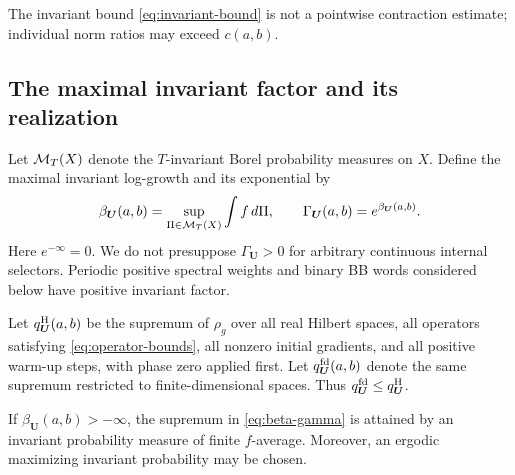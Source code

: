 \documentclass[letterpaper,twoside]{article}
\begin{document}
\begin{remark}
The invariant bound \eqref{eq:invariant-bound} is not a pointwise contraction
estimate; individual norm ratios may exceed $c(a,b)$.
\end{remark}

\subsection{The maximal invariant factor and its realization}

Let $\mathcal M_T(X)$ denote the $T$-invariant Borel probability measures on $X$.
Define the maximal invariant log-growth and its exponential by
\begin{equation}\label{eq:beta-gamma}
 \beta_{\bm U}(a,b)
 =\sup_{\Pi\in\mathcal M_T(X)}\int f\,d\Pi,
 \qquad
 \Gamma_{\bm U}(a,b)=e^{\beta_{\bm U}(a,b)}.
\end{equation}
Here $e^{-\infty}=0$. We do not presuppose $\Gamma_{\bm U}>0$ for arbitrary continuous internal selectors. Periodic positive spectral weights and binary BB words considered below have positive invariant factor.

Let $q^{\rm H}_{\bm U}(a,b)$ be the supremum of $\rho_g$ over all real
Hilbert spaces, all operators satisfying \eqref{eq:operator-bounds}, all
nonzero initial gradients, and all positive warm-up steps, with phase zero
applied first.  Let $q^{\rm fd}_{\bm U}(a,b)$ denote the same supremum
restricted to finite-dimensional spaces.  Thus
$q^{\rm fd}_{\bm U}\le q^{\rm H}_{\bm U}$.

\begin{lemma}\label{lem:max-attained}
If $\beta_{\bm U}(a,b)>-\infty$, the supremum in
\eqref{eq:beta-gamma} is attained by an invariant probability measure of
finite $f$-average.  Moreover, an ergodic maximizing invariant probability
may be chosen.
\end{lemma}
\end{document}

